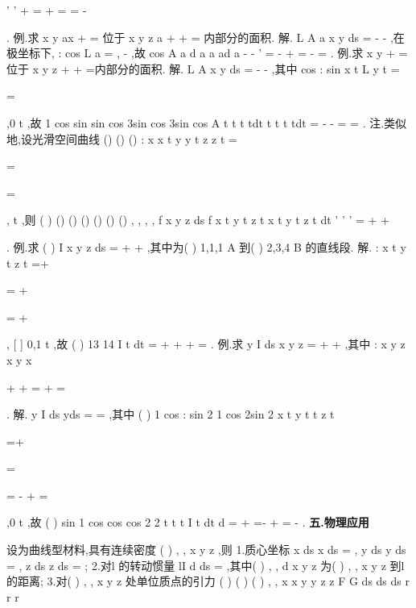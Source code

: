 '
'
+
=
+
=
=
-




\int 
\int 
\int 
. 
\textcolor{lyred}{例}.求
x
y
ax
+
=
位于
x
y
z
a
+
+
=
内部分的面积. 
解.
L
A
a
x
y ds
=
-
-
\int \nabla 
,在极坐标下,
:
cos
L
a
\rho 
\theta 
=
,
\pi 
\pi 
\theta 
-
\le 
\le 
,故 
cos
A
a
d
a
a
ad
a
\pi 
\pi 
\pi 
\pi 
\rho 
\rho 
\rho 
\theta 
\theta 
\theta 
-
-
'
=
-
\cdots 
+
=
-
\cdots 
=
\int 
\int 
. 
\textcolor{lyred}{例}.求
x
y
+
=位于
x
y
z
+
+
=内部分的面积. 
解.
L
A
x
y ds
=
-
-
\int \nabla 
,其中
cos
:
sin
x
t
L
y
t
=

=

,0
t
\pi 
\le \le 
,故 
1 cos
sin
sin cos
3sin
cos
3sin cos
A
t
t
t
tdt
t
t
t
tdt
\pi 
\pi 
\pi 
=
-
-
\cdots 
=
\cdots 
=
\int 
\int 
. 
\textcolor{lyred}{注}.类似地,设光滑空间曲线
()
()
()
:
x
x t
y
y t
z
z t
=


\Gamma 
=

=

,
t
\alpha 
\beta 
\le \le 
,则 
(
)
()
()
()
()
()
()
, ,
,
,
f x y z ds
f
x t
y t
z t
x
t
y
t
z
t dt
\beta 
\alpha 
\Gamma 
'
'
'
=
\cdots 
+
+




\int 
\int 
. 
\textcolor{lyred}{例}.求
(
)
I
x
y
z ds
\Gamma 
=
+
+
\int 
,其中\Gamma 为(
)
1,1,1
A
到(
)
2,3,4
B
的直线段. 
解.
:
x
t
y
t
z
t
=+


\Gamma 
=
+

=
+

,
[
]
0,1
t \in 
,故
(
)
13 14
I
t
dt
=
+
+
+
=
\int 
. 
\textcolor{lyred}{例}.求
y
I
ds
x
y
z
\Gamma 
=
+
+
\int \nabla 
,其中
:
x
y
z
x
y
x

+
+
=
\Gamma 
+
=

. 
解.
y
I
ds
yds
\Gamma 
\Gamma 
=
=
\int 
\int 
\nabla 
\nabla 
,其中
(
)
1 cos
:
sin
2 1 cos
2sin 2
x
t
y
t
t
z
t

=+

\Gamma 
=


=
-
+
=

,0
t
\pi 
\le \le 
,故 
(
)
sin
1 cos
cos
cos
2 2
t
t
t
I
t
dt
d
\pi 
\pi 
=
\cdots 
+
=-
+
=
-
\int 
\int 
. 
\vspace{4pt}
{\bfseries \textcolor{lyred}{五.物理应用}}

设\Gamma 为曲线型材料,具有连续密度
(
)
, ,
x y z
\mu 
,则 
1.质心坐标
x ds
x
ds
\mu 
\mu 
\Gamma 
\Gamma 
=\int 
\int 
,
y ds
y
ds
\mu 
\mu 
\Gamma 
\Gamma 
=\int 
\int 
,
z ds
z
ds
\mu 
\mu 
\Gamma 
\Gamma 
=\int 
\int 
; 
2.对l 的转动惯量
lI
d
ds
\mu 
\Gamma 
=\int 
,其中(
)
, ,
d x y z 为(
)
, ,
x y z 到l 的距离; 
3.对(
)
,
,
x
y
z
处单位质点的引力 
(
)
(
)
(
)
,
,
x
x
y
y
z
z
F
G
ds
ds
ds
r
r
r
\mu 
\mu 
\mu 
\Gamma 
\Gamma 
\Gamma 


